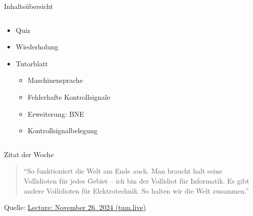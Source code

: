 \documentclass[
  german,            %
  aspectratio=169,    %
]{tumbeamer}
\begin{document}
\begin{frame}[c]{Inhaltsübersicht}{}
  \begin{columns}[c]
    \begin{column}{1\textwidth}
      \begin{itemize}
        \item Quiz
        \item Wiederholung
        \item Tutorblatt
        \begin{itemize}
          \item Maschinensprache
          \item Fehlerhafte Kontrollsignale
          \item Erweiterung: BNE
          \item Kontrollsignalbelegung
        \end{itemize}
      \end{itemize}
    \end{column}
  \end{columns}
\end{frame}

\begin{frame}[c, fragile]{}{}
  \begin{center}
    \vspace{0.5cm}
    \begin{block}{Zitat der Woche}
      \vspace{0.5cm}
      \begin{quote}
        \enquote{So funktioniert die Welt am Ende auch. Man braucht halt seine Vollidioten für jedes Gebiet -- ich bin der Vollidiot für Informatik. Es gibt andere Vollidioten für Elektrotechnik. So halten wir die Welt zusammen.}
        \vspace{0.5cm}
      \end{quote}
      \vspace{0.5cm}
    \end{block}
    \vspace{0.5cm}
    Quelle: \href{https://tum.live/w/ws24EidR/50024?t=3005}{Lecture: November 26. 2024 (tum.live)}
\end{center}
\end{frame}
\end{document}
